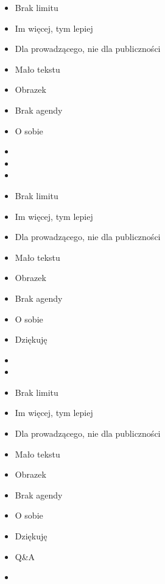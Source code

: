 \documentclass{beamer}
\begin{document}
\begin{frame}{}
	\begin{Large}
		\begin{itemize}
			\item Brak limitu
			\item Im więcej, tym lepiej
			\item Dla prowadzącego, nie dla publiczności
			\item Mało tekstu
			\item Obrazek
			\item Brak agendy
			\item O sobie
			\item 
			\item 
			\item 
		\end{itemize}
	\end{Large}
\end{frame}

\begin{frame}{}
	\begin{Large}
		\begin{itemize}
			\item Brak limitu
			\item Im więcej, tym lepiej
			\item Dla prowadzącego, nie dla publiczności
			\item Mało tekstu
			\item Obrazek
			\item Brak agendy
			\item O sobie
			\item Dziękuję
			\item 
			\item 
		\end{itemize}
	\end{Large}
\end{frame}

\begin{frame}{}
	\begin{Large}
		\begin{itemize}
			\item Brak limitu
			\item Im więcej, tym lepiej
			\item Dla prowadzącego, nie dla publiczności
			\item Mało tekstu
			\item Obrazek
			\item Brak agendy
			\item O sobie
			\item Dziękuję
			\item Q\&A
			\item 
		\end{itemize}
	\end{Large}
\end{frame}
\end{document}
